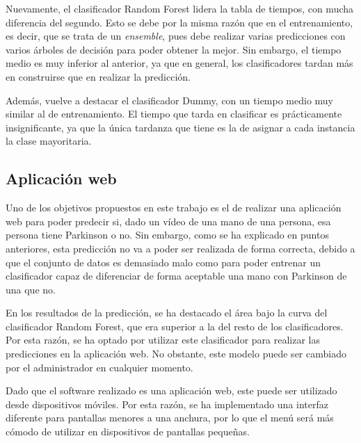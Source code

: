  Nuevamente, el clasificador Random Forest lidera la tabla de tiempos, con mucha diferencia del segundo. Esto se debe por la misma razón que en el entrenamiento, es decir, que se trata de un \textit{ensemble}, pues debe realizar varias predicciones con varios árboles de decisión para poder obtener la mejor. Sin embargo, el tiempo medio es muy inferior al anterior, ya que en general, los clasificadores tardan más en construirse que en realizar la predicción. 
 
 Además, vuelve a destacar el clasificador Dummy, con un tiempo medio muy similar al de entrenamiento. El tiempo que tarda en clasificar es prácticamente insignificante, ya que la única tardanza que tiene es la de asignar a cada instancia la clase mayoritaria.
 
 \subsection{Aplicación web}
Uno de los objetivos propuestos en este trabajo es el de realizar una aplicación web para poder predecir si, dado un vídeo de una mano de una persona, esa persona tiene Parkinson o no. Sin embargo, como se ha explicado en puntos anteriores, esta predicción no va a poder ser realizada de forma correcta, debido a que el conjunto de datos es demasiado malo como para poder entrenar un clasificador capaz de diferenciar de forma aceptable una mano con Parkinson de una que no.

En los resultados de la predicción, se ha destacado el área bajo la curva del clasificador Random Forest, que era superior a la del resto de los clasificadores. Por esta razón, se ha optado por utilizar este clasificador para realizar las predicciones en la aplicación web. No obstante, este modelo puede ser cambiado por el administrador en cualquier momento.

Dado que el software realizado es una aplicación web, este puede ser utilizado desde dispositivos móviles. Por esta razón, se ha implementado una interfaz diferente para pantallas menores a una anchura, por lo que el menú será más cómodo de utilizar en dispositivos de pantallas pequeñas.

